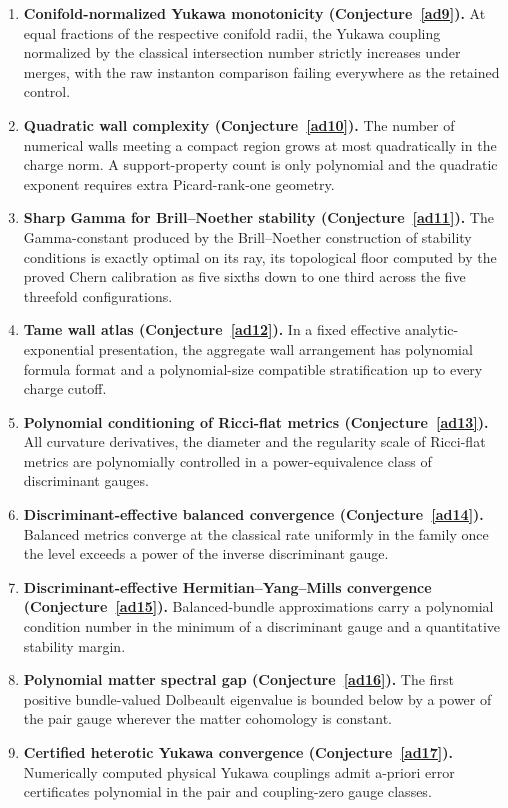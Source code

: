 \documentclass[11pt]{article}
\theoremstyle{definition}
\begin{document}
\begin{enumerate}
\item \textbf{Conifold-normalized Yukawa monotonicity (Conjecture~\ref{ad9}).}  At equal fractions of the respective conifold radii, the Yukawa coupling normalized by the classical intersection number strictly increases under merges, with the raw instanton comparison failing everywhere as the retained control.
\item \textbf{Quadratic wall complexity (Conjecture~\ref{ad10}).}  The number of numerical walls meeting a compact region grows at most quadratically in the charge norm.  A support-property count is only polynomial and the quadratic exponent requires extra Picard-rank-one geometry.
\item \textbf{Sharp Gamma for Brill--Noether stability (Conjecture~\ref{ad11}).}  The Gamma-constant produced by the Brill--Noether construction of stability conditions is exactly optimal on its ray, its topological floor computed by the proved Chern calibration as five sixths down to one third across the five threefold configurations.
\item \textbf{Tame wall atlas (Conjecture~\ref{ad12}).}  In a fixed effective analytic-exponential presentation, the aggregate wall arrangement has polynomial formula format and a polynomial-size compatible stratification up to every charge cutoff.
\item \textbf{Polynomial conditioning of Ricci-flat metrics (Conjecture~\ref{ad13}).}  All curvature derivatives, the diameter and the regularity scale of Ricci-flat metrics are polynomially controlled in a power-equivalence class of discriminant gauges.
\item \textbf{Discriminant-effective balanced convergence (Conjecture~\ref{ad14}).}  Balanced metrics converge at the classical rate uniformly in the family once the level exceeds a power of the inverse discriminant gauge.
\item \textbf{Discriminant-effective Hermitian--Yang--Mills convergence (Conjecture~\ref{ad15}).}  Balanced-bundle approximations carry a polynomial condition number in the minimum of a discriminant gauge and a quantitative stability margin.
\item \textbf{Polynomial matter spectral gap (Conjecture~\ref{ad16}).}  The first positive bundle-valued Dolbeault eigenvalue is bounded below by a power of the pair gauge wherever the matter cohomology is constant.
\item \textbf{Certified heterotic Yukawa convergence (Conjecture~\ref{ad17}).}  Numerically computed physical Yukawa couplings admit a-priori error certificates polynomial in the pair and coupling-zero gauge classes.

\end{enumerate}
\end{document}
